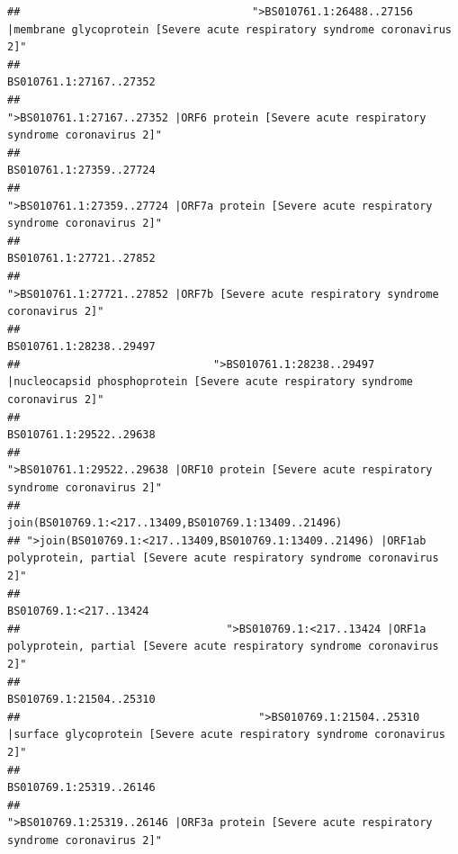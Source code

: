 \documentclass[
]{article}
\begin{document}
\begin{verbatim}
##                                    ">BS010761.1:26488..27156 |membrane glycoprotein [Severe acute respiratory syndrome coronavirus 2]" 
##                                                                                                                BS010761.1:27167..27352 
##                                             ">BS010761.1:27167..27352 |ORF6 protein [Severe acute respiratory syndrome coronavirus 2]" 
##                                                                                                                BS010761.1:27359..27724 
##                                            ">BS010761.1:27359..27724 |ORF7a protein [Severe acute respiratory syndrome coronavirus 2]" 
##                                                                                                                BS010761.1:27721..27852 
##                                                    ">BS010761.1:27721..27852 |ORF7b [Severe acute respiratory syndrome coronavirus 2]" 
##                                                                                                                BS010761.1:28238..29497 
##                              ">BS010761.1:28238..29497 |nucleocapsid phosphoprotein [Severe acute respiratory syndrome coronavirus 2]" 
##                                                                                                                BS010761.1:29522..29638 
##                                            ">BS010761.1:29522..29638 |ORF10 protein [Severe acute respiratory syndrome coronavirus 2]" 
##                                                                                   join(BS010769.1:<217..13409,BS010769.1:13409..21496) 
## ">join(BS010769.1:<217..13409,BS010769.1:13409..21496) |ORF1ab polyprotein, partial [Severe acute respiratory syndrome coronavirus 2]" 
##                                                                                                                 BS010769.1:<217..13424 
##                                ">BS010769.1:<217..13424 |ORF1a polyprotein, partial [Severe acute respiratory syndrome coronavirus 2]" 
##                                                                                                                BS010769.1:21504..25310 
##                                     ">BS010769.1:21504..25310 |surface glycoprotein [Severe acute respiratory syndrome coronavirus 2]" 
##                                                                                                                BS010769.1:25319..26146 
##                                            ">BS010769.1:25319..26146 |ORF3a protein [Severe acute respiratory syndrome coronavirus 2]" 

\end{verbatim}
\end{document}
